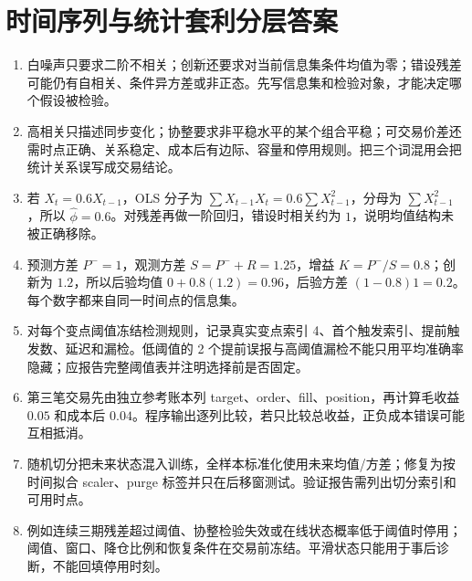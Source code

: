 \chapter{时间序列与统计套利分层答案}

\begin{enumerate}[leftmargin=*]
  \item 白噪声只要求二阶不相关；创新还要求对当前信息集条件均值为零；错设残差可能仍有自相关、条件异方差或非正态。先写信息集和检验对象，才能决定哪个假设被检验。
  \item 高相关只描述同步变化；协整要求非平稳水平的某个组合平稳；可交易价差还需时点正确、关系稳定、成本后有边际、容量和停用规则。把三个词混用会把统计关系误写成交易结论。
  \item 若 $X_t=0.6X_{t-1}$，OLS 分子为 $\sum X_{t-1}X_t=0.6\sum X_{t-1}^2$，分母为 $\sum X_{t-1}^2$，所以 $\widehat\phi=0.6$。对残差再做一阶回归，错设时相关约为 $1$，说明均值结构未被正确移除。
  \item 预测方差 $P^-=1$，观测方差 $S=P^-+R=1.25$，增益 $K=P^-/S=0.8$；创新为 $1.2$，所以后验均值 $0+0.8(1.2)=0.96$，后验方差 $(1-0.8)1=0.2$。每个数字都来自同一时间点的信息集。
  \item 对每个变点阈值冻结检测规则，记录真实变点索引 4、首个触发索引、提前触发数、延迟和漏检。低阈值的 2 个提前误报与高阈值漏检不能只用平均准确率隐藏；应报告完整阈值表并注明选择前是否固定。
  \item 第三笔交易先由独立参考账本列 target、order、fill、position，再计算毛收益 $0.05$ 和成本后 $0.04$。程序输出逐列比较，若只比较总收益，正负成本错误可能互相抵消。
  \item 随机切分把未来状态混入训练，全样本标准化使用未来均值/方差；修复为按时间拟合 scaler、purge 标签并只在后移窗测试。验证报告需列出切分索引和可用时点。
  \item 例如连续三期残差超过阈值、协整检验失效或在线状态概率低于阈值时停用；阈值、窗口、降仓比例和恢复条件在交易前冻结。平滑状态只能用于事后诊断，不能回填停用时刻。
\end{enumerate}
